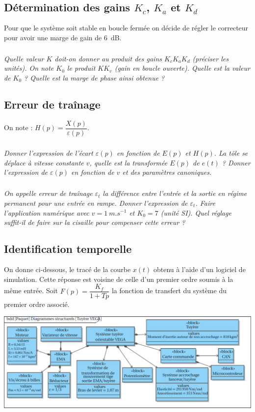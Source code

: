 \documentclass[10pt,fleqn]{article} %
\begin{document}
\begin{multicols}{2}
\subsection*{Détermination des gains $K_c$, $K_a$ et $K_d$}
Pour que le système soit stable en boucle fermée on décide de régler le correcteur pour avoir une marge de gain de \SI{6}{dB}.

\subparagraph{}\textit{Quelle valeur $K$ doit-on donner au produit des gains $K_c K_a K_d$ (préciser les unités).
On note $K_0$ le produit $KK_v$ (gain en boucle ouverte). Quelle est la valeur de $K_0$ ?
Quelle est la marge de phase ainsi obtenue ?}


\subsection*{Erreur de traînage}
On note :   $H(p)=\dfrac{X(p)}{\varepsilon(p)}$.

\subparagraph{}\textit{Donner l’expression de l’écart $\varepsilon(p)$ en fonction de $E(p)$ et $H(p)$. La tôle se déplace à vitesse constante $v$, quelle est la transformée $E(p)$ de $e(t)$ ? Donner l’expression de $\varepsilon(p)$ en fonction de $v$ et des paramètres canoniques.}

\subparagraph{}\textit{On appelle erreur de traînage $\varepsilon_t$ la différence entre l’entrée et la sortie en régime permanent pour une entrée en rampe. Donner l’expression de $\varepsilon_t$. Faire l’application numérique avec $v = \SI{1}{m.s^{-1}}$ et $K_0 = 7$ (unité SI).	
Quel réglage suffit-il de faire sur la cisaille pour compenser cette erreur ?}


\subsection*{Identification temporelle}
On donne ci-dessous, le tracé de la courbe $x(t)$ obtenu à l’aide d’un logiciel de simulation.
Cette réponse est voisine de celle d’un premier ordre soumis à la même entrée.
Soit $F(p)=\dfrac{K_f}{1+Tp}$ la fonction de transfert du système du premier ordre associé.


\begin{center}
\includegraphics[width=\linewidth]{images/fig_03}
\end{center}



\end{multicols}
\end{document}
